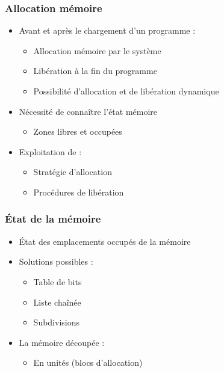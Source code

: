 \begin{frame}
\frametitle{Allocation mémoire}
\begin{itemize}
\item Avant et après le chargement d’un programme :
\begin{itemize}
\item Allocation mémoire par le système
\item Libération à la fin du programme
\item Possibilité d'allocation et de libération dynamique
\end{itemize}
\item Nécessité de connaître l'état mémoire
\begin{itemize}
\item Zones libres et occupées
\end{itemize}
\item Exploitation de :
\begin{itemize}
\item Stratégie d’allocation
\item Procédures de libération
\end{itemize}
\end{itemize}
\end{frame}

\begin{frame}
\frametitle{État de la mémoire}
\begin{itemize}
\item État des emplacements occupés de la mémoire
\item Solutions possibles :
\begin{itemize}
\item Table de bits
\item Liste chaînée
\item Subdivisions
\end{itemize}
\item La mémoire découpée :
\begin{itemize}
\item En unités (blocs d’allocation)
\end{itemize}
\end{itemize}
\end{frame}


